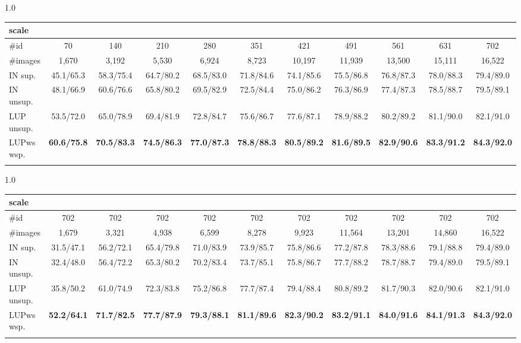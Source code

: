 \documentclass[10pt,twocolumn,letterpaper]{article}
\begin{document}
\begin{table*}[h]
	\begin{subtable}[h]{1.0\textwidth}
		\centering
		\begin{tabular}{l|cccccccccc}
			\shline
			scale &  &  &  &  &  &  &  &  &  &  \\
			\hline
			\#id & 70 & 140 & 210 & 280 & 351 & 421 & 491 & 561 & 631 & 702 \\ 
			\#images & 1,670 & 3,192 & 5,530 & 6,924 & 8,723 & 10,197 & 11,939 & 13,500 & 15,111 & 16,522 \\
			\hline
			IN sup.   & 45.1/65.3 & 58.3/75.4 & 64.7/80.2 & 68.5/83.0 & 71.8/84.6 & 74.1/85.6 & 75.5/86.8 & 76.8/87.3 & 78.0/88.3 & 79.4/89.0 \\ 
			IN unsup. & 48.1/66.9 & 60.6/76.6 & 65.8/80.2 & 69.5/82.9 & 72.5/84.4 & 75.0/86.2 & 76.3/86.9 & 77.4/87.3 & 78.5/88.7 & 79.5/89.1 \\
			LUP unsup.& 53.5/72.0 & 65.0/78.9 & 69.4/81.9 & 72.8/84.7 & 75.6/86.7 & 77.6/87.1 & 78.9/88.2 & 80.2/89.2 & 81.1/90.0 & 82.1/91.0 \\ 
			\hline
			LUPws wsp.& \textbf{60.6/75.8} & \textbf{70.5/83.3} & \textbf{74.5/86.3} & \textbf{77.0/87.3} & \textbf{78.8/88.3} & \textbf{80.5/89.2} & \textbf{81.6/89.5} & \textbf{82.9/90.6} & \textbf{83.3/91.2} & \textbf{84.3/92.0} \\
			\shline
		\end{tabular}
		\vspace{-0.12cm}
		\caption{DukeMTMC small-scale}
		\label{tab:ss-duke}
	\end{subtable}
	
	\begin{subtable}[h]{1.0\textwidth}
		\centering
		\begin{tabular}{l|cccccccccc}
			\shline
			scale &  &  &  &  &  &  &  &  &  &  \\
			\hline
			\#id & 702 & 702 & 702 & 702 & 702 & 702 & 702 & 702 & 702 & 702 \\
			\#images & 1,679 & 3,321 & 4,938 & 6,599 & 8,278 & 9,923 & 11,564 & 13,201 & 14,860 & 16,522 \\
			\hline
			IN sup.   & 31.5/47.1 & 56.2/72.1 & 65.4/79.8 & 71.0/83.9 & 73.9/85.7 & 75.8/86.6 & 77.2/87.8 & 78.3/88.6 & 79.1/88.8 & 79.4/89.0 \\
			IN unsup. & 32.4/48.0 & 56.4/72.2 & 65.3/80.2 & 70.2/83.4 & 73.7/85.1 & 75.8/86.7 & 77.7/88.2 & 78.7/88.7 & 79.4/89.0 & 79.5/89.1 \\
			LUP unsup.& 35.8/50.2 & 61.0/74.9 & 72.3/83.8 & 75.2/86.8 & 77.7/87.4 & 79.4/88.4 & 80.8/89.2 & 81.7/90.3 & 82.0/90.6 & 82.1/91.0 \\
			\hline
			LUPws wsp.& \textbf{52.2/64.1} & \textbf{71.7/82.5} & \textbf{77.7/87.9} & \textbf{79.3/88.1} & \textbf{81.1/89.6} & \textbf{82.3/90.2} & \textbf{83.2/91.1} & \textbf{84.0/91.6} & \textbf{84.1/91.3} & \textbf{84.3/92.0} \\
			\shline
		\end{tabular}
		\vspace{-0.12cm}
		\caption{DukeMTMC few-shot}
		\label{tab:fs-duke}
	\end{subtable}
	

\end{table*}
\end{document}
